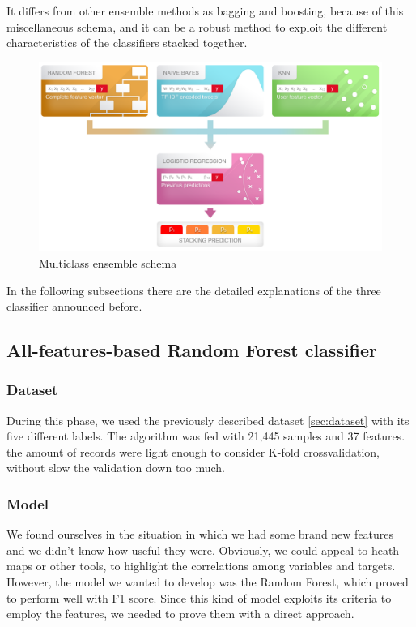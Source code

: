 It differs from other ensemble methods as bagging and boosting, because of this miscellaneous schema, and it can be a robust method to exploit the different characteristics of the classifiers stacked together.

\begin{figure}[htp!]
	\centering
	\includegraphics[width=\columnwidth]{chapter5/figure/stacking.png}
	\caption{Multiclass ensemble schema}
	\label{fig:stacking_schema}
\end{figure}
In the following subsections there are the detailed explanations of the three classifier announced before.

\subsection{All-features-based Random Forest classifier}
\subsubsection{Dataset}
During this phase, we used the previously described dataset \ref{sec:dataset} with its five different labels.
The algorithm was fed with 21,445 samples and 37 features. the amount of records were light enough to consider K-fold crossvalidation, without slow the validation down too much.
\subsubsection{Model}
We found ourselves in the situation in which we had some brand new features and we didn't know how useful they were. Obviously, we could appeal to heath-maps or other tools, to highlight the correlations among variables and targets.
However, the model we wanted to develop was the Random Forest, which proved to perform well with F1 score. Since this kind of model exploits its criteria to employ the features, we needed to prove them with a direct approach.

